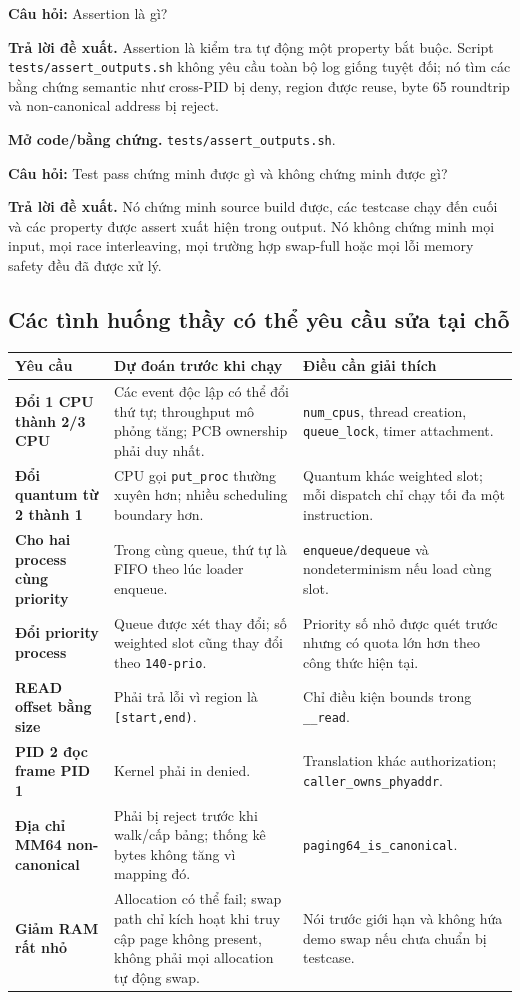 \documentclass[11pt,a4paper]{article}
\newcommand{\code}[1]{\texttt{\color{navy}#1}}
\newcommand{\q}[1]{%
  \vspace{0.55em}\noindent
  \colorbox{pale}{\parbox{\dimexpr\textwidth-2\fboxsep}{\textbf{\color{navy}Câu hỏi:} #1}}%
  \par\vspace{0.3em}}
\newcommand{\ans}[1]{\textbf{\color{cyan}Trả lời đề xuất.} #1\par}
\newcommand{\proofcode}[1]{\textbf{\color{orange}Mở code/bằng chứng.} #1\par}
\begin{document}
\q{Assertion là gì?}
\ans{Assertion là kiểm tra tự động một property bắt buộc. Script
\code{tests/assert\_outputs.sh} không yêu cầu toàn bộ log giống tuyệt đối; nó
tìm các bằng chứng semantic như cross-PID bị deny, region được reuse, byte 65
roundtrip và non-canonical address bị reject.}
\proofcode{\code{tests/assert\_outputs.sh}.}

\q{Test pass chứng minh được gì và không chứng minh được gì?}
\ans{Nó chứng minh source build được, các testcase chạy đến cuối và các
property được assert xuất hiện trong output. Nó không chứng minh mọi input,
mọi race interleaving, mọi trường hợp swap-full hoặc mọi lỗi memory safety đều
đã được xử lý.}

\subsection{Các tình huống thầy có thể yêu cầu sửa tại chỗ}

\begin{longtable}{>{\bfseries\color{navy}}p{3.6cm} p{5.4cm} p{6.1cm}}
\toprule
\textbf{Yêu cầu} & \textbf{Dự đoán trước khi chạy} & \textbf{Điều cần giải thích}\\
\midrule
\endhead
Đổi 1 CPU thành 2/3 CPU &
Các event độc lập có thể đổi thứ tự; throughput mô phỏng tăng; PCB ownership
phải duy nhất. &
\code{num\_cpus}, thread creation, \code{queue\_lock}, timer attachment.\\

Đổi quantum từ 2 thành 1 &
CPU gọi \code{put\_proc} thường xuyên hơn; nhiều scheduling boundary hơn. &
Quantum khác weighted slot; mỗi dispatch chỉ chạy tối đa một instruction.\\

Cho hai process cùng priority &
Trong cùng queue, thứ tự là FIFO theo lúc loader enqueue. &
\code{enqueue/dequeue} và nondeterminism nếu load cùng slot.\\

Đổi priority process &
Queue được xét thay đổi; số weighted slot cũng thay đổi theo
\code{140-prio}. &
Priority số nhỏ được quét trước nhưng có quota lớn hơn theo công thức hiện tại.\\

READ offset bằng size &
Phải trả lỗi vì region là \code{[start,end)}. &
Chỉ điều kiện bounds trong \code{\_\_read}.\\

PID 2 đọc frame PID 1 &
Kernel phải in denied. &
Translation khác authorization; \code{caller\_owns\_phyaddr}.\\

Địa chỉ MM64 non-canonical &
Phải bị reject trước khi walk/cấp bảng; thống kê bytes không tăng vì mapping đó. &
\code{paging64\_is\_canonical}.\\

Giảm RAM rất nhỏ &
Allocation có thể fail; swap path chỉ kích hoạt khi truy cập page không present,
không phải mọi allocation tự động swap. &
Nói trước giới hạn và không hứa demo swap nếu chưa chuẩn bị testcase.\\
\bottomrule
\end{longtable}
\end{document}
